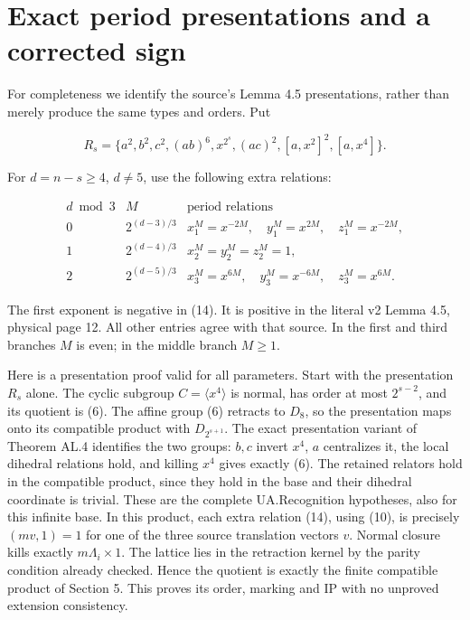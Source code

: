 \section{Exact period presentations and a corrected sign}\label{exact-period-presentations-and-a-corrected-sign}

For completeness we identify the source's Lemma 4.5 presentations,
rather than merely produce the same types and orders. Put

\[R_s=\{a^2,b^2,c^2,(ab)^6,x^{2^s},(ac)^2,
[a,x^2]^2,[a,x^4]\}.\]

For \(d=n-s\geq4\), \(d\ne5\), use the following extra relations:

\[\begin{array}{c|c|l}
d\bmod3&M&\text{period relations}\\\hline
0&2^{(d-3)/3}&x_1^M=x^{-2M},\quad y_1^M=x^{2M},\quad z_1^M=x^{-2M},\\
1&2^{(d-4)/3}&x_2^M=y_2^M=z_2^M=1,\\
2&2^{(d-5)/3}&x_3^M=x^{6M},\quad y_3^M=x^{-6M},\quad z_3^M=x^{6M}.
\end{array}\tag{14}\]

The first exponent is negative in (14). It is positive in the literal
v2 Lemma 4.5, physical page 12. All other entries agree with that
source. In the first and third branches \(M\) is even; in the middle
branch \(M\geq1\).

Here is a presentation proof valid for all parameters. Start with the
presentation \(R_s\) alone. The cyclic subgroup
\(C=\langle x^4\rangle\) is normal, has order at most \(2^{s-2}\), and
its quotient is (6). The affine group (6) retracts to \(D_8\), so the
presentation maps onto its compatible product with \(D_{2^{s+1}}\).
The exact presentation variant of Theorem AL.4 identifies the two
groups: $b,c$ invert $x^4$, $a$ centralizes it, the local dihedral
relations hold, and killing $x^4$ gives exactly (6). The retained
relators hold in the compatible product, since they hold in the base
and their dihedral coordinate is trivial. These are the complete
UA.Recognition hypotheses, also for this infinite base. In this product, each extra relation (14),
using (10), is precisely \((m v,1)=1\) for one of the three source
translation vectors \(v\). Normal closure kills exactly
\(m\Lambda_i\times1\). The lattice lies in the retraction kernel by
the parity condition already checked. Hence the quotient is exactly
the finite compatible product of Section 5. This proves its order,
marking and IP with no unproved extension consistency.

